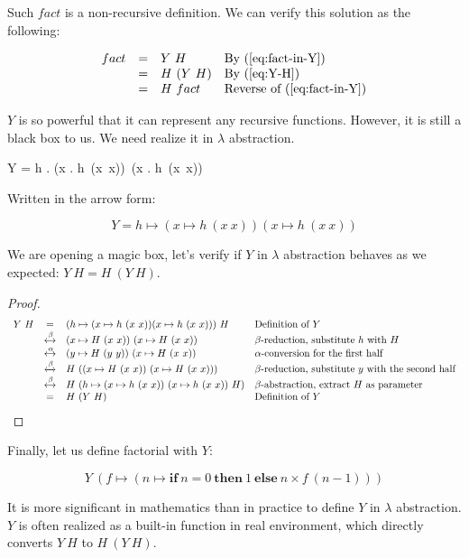\documentclass[b5paper]{article}
\begin{document}
Such $fact$ is a non-recursive definition. We can verify this solution as the following:

\[
\begin{array}{rcll}
fact & = & Y\ H & \text{By (\ref{eq:fact-in-Y})} \\
     & = & H\ (Y\ H) & \text{By (\ref{eq:Y-H})} \\
     & = & H\ fact & \text{Reverse of (\ref{eq:fact-in-Y})}
\end{array}
\]

$Y$ is so powerful that it can represent any recursive functions. However, it is still a black box to us. We need realize it in $\lambda$ abstraction.

\be
Y = \lambda h . (\lambda x . h\ (x\ x))\ (\lambda x . h\ (x\ x))
\ee

Written in the arrow form:

\[
Y = h \mapsto (x \mapsto h\ (x\ x)) (x \mapsto h\ (x\ x))
\]

We are opening a magic box, let's verify if $Y$ in $\lambda$ abstraction behaves as we expected: $Y\ H = H\ (Y\ H)$.

\begin{proof}
\[
\begin{array}{rcll}
Y\ H & = & (h \mapsto (x \mapsto h\ (x\ x)) (x \mapsto h\ (x\ x)))\ H & \text{Definition of $Y$} \\
     & \xleftrightarrow{\beta} & (x \mapsto H\ (x\ x))\ (x \mapsto H\ (x\ x)) & \text{$\beta$-reduction, substitute $h$ with $H$} \\
     & \xleftrightarrow{\alpha} & (y \mapsto H\ (y\ y))\ (x \mapsto H\ (x\ x)) & \text{$\alpha$-conversion for the first half} \\
     & \xleftrightarrow{\beta} & H\ ((x \mapsto H\ (x\ x))\ (x \mapsto H\ (x\ x))) & \text{$\beta$-reduction, substitute $y$ with the second half} \\
     & \xleftrightarrow{\beta} & H\ (h \mapsto (x \mapsto h\ (x\ x))\ (x \mapsto h\ (x\ x))\ H) & \text{$\beta$-abstraction, extract $H$ as parameter} \\
     & = & H\ (Y\ H) & \text{Definition of $Y$}
\end{array}
\]
\end{proof}

Finally, let us define factorial with $Y$:

\[
Y\ (f \mapsto (n \mapsto \textbf{if}\ n = 0\ \textbf{then}\ 1\ \textbf{else}\ n \times f\ (n - 1)))
\]

It is more significant in mathematics than in practice to define $Y$ in $\lambda$ abstraction. $Y$ is often realized as a built-in function in real environment, which directly converts $Y\ H$ to $H\ (Y\ H)$.
\end{document}
